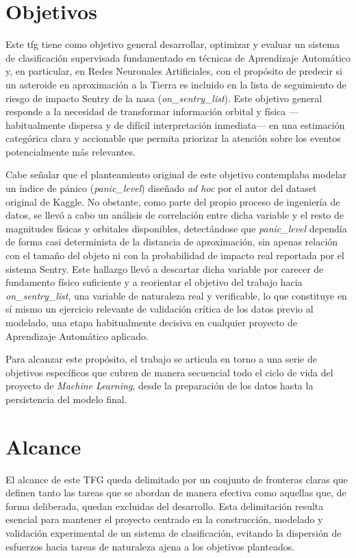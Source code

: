 \documentclass[12pt]{report} %
\begin{document}
\section{Objetivos}

Este \gls{tfg} tiene como objetivo general desarrollar, optimizar y evaluar un sistema de clasificación supervisada fundamentado en técnicas de Aprendizaje Automático y, en particular, en Redes Neuronales Artificiales, con el propósito de predecir si un asteroide en aproximación a la Tierra es incluido en la lista de seguimiento de riesgo de impacto Sentry de la \gls{nasa} (\textit{on\_sentry\_list}). Este objetivo general responde a la necesidad de transformar información orbital y física ---habitualmente dispersa y de difícil interpretación inmediata--- en una estimación categórica clara y accionable que permita priorizar la atención sobre los eventos potencialmente más relevantes.

Cabe señalar que el planteamiento original de este objetivo contemplaba modelar un índice de pánico (\textit{panic\_level}) diseñado \textit{ad hoc} por el autor del dataset original de Kaggle. No obstante, como parte del propio proceso de ingeniería de datos, se llevó a cabo un análisis de correlación entre dicha variable y el resto de magnitudes físicas y orbitales disponibles, detectándose que \textit{panic\_level} dependía de forma casi determinista de la distancia de aproximación, sin apenas relación con el tamaño del objeto ni con la probabilidad de impacto real reportada por el sistema Sentry. Este hallazgo llevó a descartar dicha variable por carecer de fundamento físico suficiente y a reorientar el objetivo del trabajo hacia \textit{on\_sentry\_list}, una variable de naturaleza real y verificable, lo que constituye en sí mismo un ejercicio relevante de validación crítica de los datos previo al modelado, una etapa habitualmente decisiva en cualquier proyecto de Aprendizaje Automático aplicado.

Para alcanzar este propósito, el trabajo se articula en torno a una serie de objetivos específicos que cubren de manera secuencial todo el ciclo de vida del proyecto de \textit{Machine Learning}, desde la preparación de los datos hasta la persistencia del modelo final.

\section{Alcance}

El alcance de este TFG queda delimitado por un conjunto de fronteras claras que definen tanto las tareas que se abordan de manera efectiva como aquellas que, de forma deliberada, quedan excluidas del desarrollo. Esta delimitación resulta esencial para mantener el proyecto centrado en la construcción, modelado y validación experimental de un sistema de clasificación, evitando la dispersión de esfuerzos hacia tareas de naturaleza ajena a los objetivos planteados.
\end{document}
